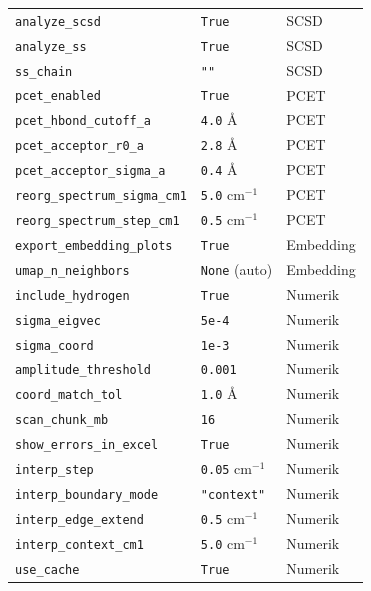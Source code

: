 \documentclass[11pt,a4paper,twoside]{article}
\theoremstyle{remark}
\begin{document}
\begin{longtable}{p{} p{} p{}}
\texttt{analyze\_scsd}              & \texttt{True}        & SCSD \\
\texttt{analyze\_ss}                & \texttt{True}        & SCSD \\
\texttt{ss\_chain}                  & \texttt{""}          & SCSD \\
\midrule
\texttt{pcet\_enabled}              & \texttt{True}        & PCET \\
\texttt{pcet\_hbond\_cutoff\_a}     & \texttt{4.0} \AA     & PCET \\
\texttt{pcet\_acceptor\_r0\_a}      & \texttt{2.8} \AA     & PCET \\
\texttt{pcet\_acceptor\_sigma\_a}   & \texttt{0.4} \AA     & PCET \\
\texttt{reorg\_spectrum\_sigma\_cm1} & \texttt{5.0} cm$^{-1}$  & PCET \\
\texttt{reorg\_spectrum\_step\_cm1} & \texttt{0.5} cm$^{-1}$  & PCET \\
\midrule
\texttt{export\_embedding\_plots}   & \texttt{True}        & Embedding \\
\texttt{umap\_n\_neighbors}         & \texttt{None} (auto) & Embedding \\
\midrule
\texttt{include\_hydrogen}          & \texttt{True}        & Numerik \\
\texttt{sigma\_eigvec}              & \texttt{5e-4}        & Numerik \\
\texttt{sigma\_coord}               & \texttt{1e-3}        & Numerik \\
\texttt{amplitude\_threshold}       & \texttt{0.001}       & Numerik \\
\texttt{coord\_match\_tol}          & \texttt{1.0} \AA     & Numerik \\
\texttt{scan\_chunk\_mb}            & \texttt{16}          & Numerik \\
\texttt{show\_errors\_in\_excel}    & \texttt{True}        & Numerik \\
\texttt{interp\_step}               & \texttt{0.05} cm$^{-1}$ & Numerik \\
\texttt{interp\_boundary\_mode}     & \texttt{"context"}   & Numerik \\
\texttt{interp\_edge\_extend}       & \texttt{0.5} cm$^{-1}$ & Numerik \\
\texttt{interp\_context\_cm1}       & \texttt{5.0} cm$^{-1}$ & Numerik \\
\texttt{use\_cache}                 & \texttt{True}        & Numerik \\
\bottomrule
\end{longtable}
\end{document}

